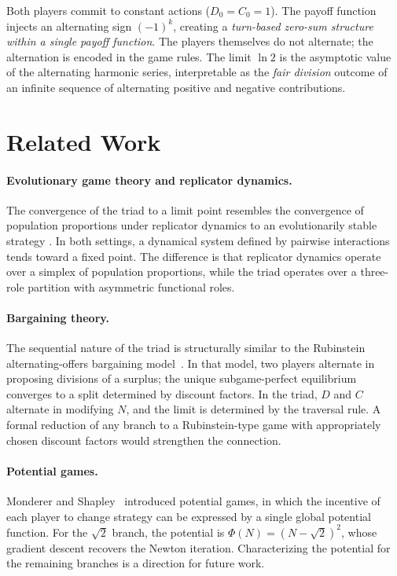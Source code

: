 \documentclass[12pt]{article}
\theoremstyle{definition}
\theoremstyle{remark}
\begin{document}
Both players commit to constant actions ($D_0 = C_0 = 1$).  The payoff function injects
an alternating sign $(-1)^k$, creating a \emph{turn-based zero-sum structure within a
single payoff function}.  The players themselves do not alternate; the alternation is
encoded in the game rules.  The limit $\ln 2$ is the asymptotic value of the alternating
harmonic series, interpretable as the \emph{fair division} outcome of an infinite
sequence of alternating positive and negative contributions.

\section{Related Work}
\label{sec:related}

\paragraph{Evolutionary game theory and replicator dynamics.}
The convergence of the triad to a limit point resembles the convergence of population
proportions under replicator dynamics to an evolutionarily stable strategy
\cite{HS98,Wei95}.  In both settings, a dynamical system defined by pairwise interactions
tends toward a fixed point.  The difference is that replicator dynamics operate over a
simplex of population proportions, while the triad operates over a three-role partition
with asymmetric functional roles.

\paragraph{Bargaining theory.}
The sequential nature of the triad is structurally similar to the Rubinstein
alternating-offers bargaining model~\cite{Rub82}.  In that model, two players alternate
in proposing divisions of a surplus; the unique subgame-perfect equilibrium converges to
a split determined by discount factors.  In the triad, $D$ and $C$ alternate in
modifying $N$, and the limit is determined by the traversal rule.  A formal reduction of
any branch to a Rubinstein-type game with appropriately chosen discount factors would
strengthen the connection.

\paragraph{Potential games.}
Monderer and Shapley~\cite{MS96} introduced potential games, in which the incentive of
each player to change strategy can be expressed by a single global potential function.
For the $\sqrt{2}$ branch, the potential is $\Phi(N) = (N - \sqrt{2})^2$, whose
gradient descent recovers the Newton iteration.  Characterizing the potential for the
remaining branches is a direction for future work.
\end{document}
